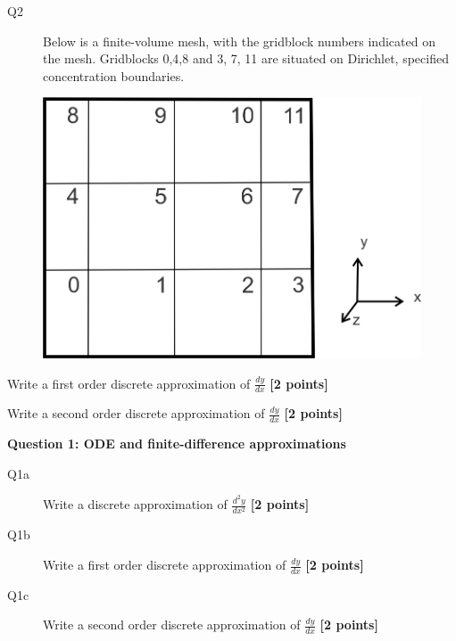\documentclass{article}
\begin{document}
\begin{description}
\item [Q2]  Below is a finite-volume mesh, with the gridblock numbers indicated on the mesh. Gridblocks 0,4,8 and 3, 7, 11 are situated on Dirichlet, specified concentration boundaries.


\end{description}


\begin{figure}[H]
  \includegraphics[scale=0.75]{by_hand_numbered.png}
  \label{fig:grid}
\end{figure}

\begin{description}
\vspace{3cm}
\item [Q1b] Write a first order discrete approximation of $\frac{dy}{dx}$ \textbf{[2 points]}
\vspace{3.5cm}

\item [Q1c] Write a second order discrete approximation of $\frac{dy}{dx}$ \textbf{[2 points]}
\vspace{3.5cm}

\end{description}

\textbf{Question 1: ODE and finite-difference approximations}

\begin{description}
\item [Q1a] Write a discrete approximation of $\frac{d^2y}{dx^2}$ \textbf{[2 points]}
\vspace{3cm}
\item [Q1b] Write a first order discrete approximation of $\frac{dy}{dx}$ \textbf{[2 points]}
\vspace{3.5cm}

\item [Q1c] Write a second order discrete approximation of $\frac{dy}{dx}$ \textbf{[2 points]}
\vspace{3.5cm}

\end{description}
\end{document}
